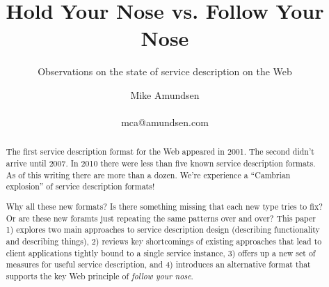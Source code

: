 \documentclass{wsrest2014}
\renewcommand{\email}{}
\begin{document}

\title{Hold Your Nose vs. Follow Your Nose}
\subtitle {Observations on the state of service description on the Web}

\author{
\alignauthor
Mike Amundsen\\
    \\
	\email{mca@amundsen.com}
}

\maketitle

\begin{abstract}
 \par{}The first service description format for the Web appeared in 2001. The second didn't arrive until 2007. In 2010 there were less than five known service description formats. As of this writing there are more than a dozen. We're experience a ``Cambrian explosion'' of service description formats!
 \par{}Why all these new formats? Is there something missing that each new type tries to fix? Or are these new foramts just repeating the same patterns over and over? This paper 1) explores two main approaches to service description design (describing functionality and describing things), 2) reviews key shortcomings of existing approaches that lead to client applications tightly bound to a single service instance, 3) offers up a new set of measures for useful service description, and 4) introduces an alternative format  that supports the key Web principle of \emph{follow your nose}.

\end{abstract}
\hypertarget{_brief_tour_of_service_description_formats}{}
\end{document}
